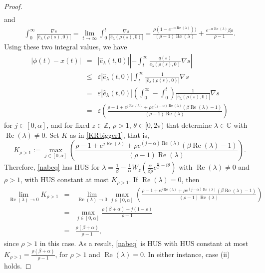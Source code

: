 \documentclass[12pt,reqno]{amsart}
\theoremstyle{plain}
\theoremstyle{definition}
\newcommand{\Z}{\ensuremath{\mathbb{Z}}}
\newcommand{\C}{\ensuremath{\mathbb{C}}}
\numberwithin{equation}{section}
\numberwithin{theorem}{section}
\begin{document}
\begin{proof}
\begin{eqnarray}
\end{eqnarray}
and 
\begin{eqnarray*}
 \int_{0}^{\infty} \frac{\nabla s}{|\widehat{e}_{\lambda}(\rho(s),0)|} 
  = \lim_{t\rightarrow\infty}\int_{0}^{t} \frac{\nabla s}{|\widehat{e}_{\lambda}(\rho(s),0)|} 
	= \frac{\rho(1-e^{-\alpha\operatorname{Re}(\lambda)}))}{(\rho-1)\operatorname{Re}(\lambda)} + \frac{e^{-\alpha\operatorname{Re}(\lambda)}\beta \rho}{\rho-1} .
\end{eqnarray*}
Using these two integral values, we have
\begin{eqnarray*} 
 |\phi(t)-x(t)| &=& |\widehat{e}_{\lambda}(t,0)| \left|-\int_{t}^{\infty} \frac{q(s)}{\widehat{e}_{\lambda}(\rho(s),0)}\nabla s\right| \\
	&\le& \varepsilon |\widehat{e}_{\lambda}(t,0)| \int_{t}^{\infty} \frac{1}{|\widehat{e}_{\lambda}(\rho(s),0)|}\nabla s \\
	& = & \varepsilon |\widehat{e}_{\lambda}(t,0)| \left(\int_{0}^{\infty}-\int_{0}^{t} \right)\frac{1}{|\widehat{e}_{\lambda}(\rho(s),0)|}\nabla s  \\
	& = & \varepsilon \left(\frac{\rho-1+e^{j\operatorname{Re}(\lambda)}+\rho e^{(j-\alpha)\operatorname{Re}(\lambda)}\left(\beta\operatorname{Re}(\lambda)-1\right)}{(\rho-1)\operatorname{Re}(\lambda)}\right)
\end{eqnarray*}
for $j\in[0,\alpha]$, and for fixed $z\in\Z$, $\rho>1$, $\theta\in[0,2\pi)$ that determine $\lambda\in\C$ with $\operatorname{Re}(\lambda)\ne 0$. Set 
$K$ as in \eqref{KRbigger1}, that is,
$$ K_{\rho>1}:=\max_{j\in[0,\alpha]}\left(\frac{\rho-1+e^{j\operatorname{Re}(\lambda)}+\rho e^{(j-\alpha)\operatorname{Re}(\lambda)}\left(\beta\operatorname{Re}(\lambda)-1\right)}{(\rho-1)\operatorname{Re}(\lambda)}\right). $$
Therefore, \eqref{nabeq} has HUS for $\lambda = \frac{1}{\beta}-\frac{1}{\alpha}W_z\left(\frac{\alpha}{\beta \rho}e^{\frac{\alpha}{\beta}-i\theta}\right)$ with $\operatorname{Re}(\lambda)\ne 0$ and $\rho>1$, with HUS constant at most $K_{\rho>1}$. If $\operatorname{Re}(\lambda)=0$, then
\begin{eqnarray*} 
 \lim_{\operatorname{Re}(\lambda)\rightarrow 0} K_{\rho>1} &=& \lim_{\operatorname{Re}(\lambda)\rightarrow 0}\max_{j\in[0,\alpha]}\left(\frac{\rho-1+e^{j\operatorname{Re}(\lambda)}+\rho e^{(j-\alpha)\operatorname{Re}(\lambda)}\left(\beta\operatorname{Re}(\lambda)-1\right)}{(\rho-1)\operatorname{Re}(\lambda)}\right) \\
  &=& \max_{j\in[0,\alpha]}\frac{\rho(\beta+\alpha)+j(1-\rho)}{\rho-1} \\
	&=& \frac{\rho(\beta+\alpha)}{\rho-1},
\end{eqnarray*}
since $\rho>1$ in this case. As a result, \eqref{nabeq} is HUS with HUS constant at most $K_{\rho>1}=\frac{\rho(\beta+\alpha)}{\rho-1}$, for $\rho>1$ and $\operatorname{Re}(\lambda)=0$. In either instance, case (ii) holds.


\end{proof}
\end{document}
